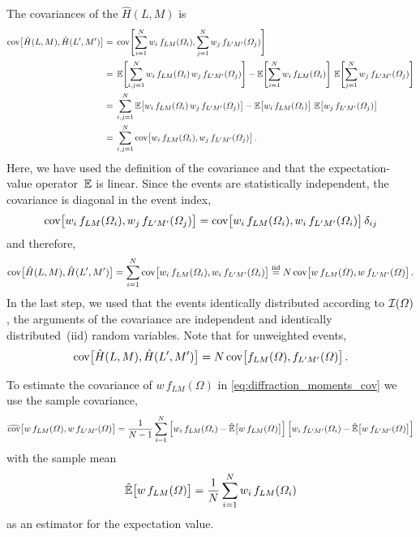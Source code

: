 The covariances of the $\hat{H}(L, M)$ is
\begin{align}
  \cov[1]{\hat{H}(L, M), \hat{H}(L', M')}
  ={}& \cov[4]{\sum_{i = 1}^N w_i\, f_{L M}(\Omega_i), \sum_{j = 1}^N w_j\, f_{L' M'}(\Omega_j)} \nonumber
  \\
  ={}& \exptVal[4]{\sum_{i, j = 1}^N w_i\,f_{L M}(\Omega_i)\,  w_j\, f_{L' M'}(\Omega_j)}
     - \exptVal[4]{\sum_{i = 1}^N w_i\, f_{L M}(\Omega_i)}\, \exptVal[4]{\sum_{j = 1}^N w_j\, f_{L' M'}(\Omega_j)} \nonumber
  \\
  ={}& \sum_{i, j = 1}^N \exptVal[1]{w_i\, f_{L M}(\Omega_i)\, w_j\, f_{L' M'}(\Omega_j)}
     - \exptVal[1]{w_i\, f_{L M}(\Omega_i)}\, \exptVal[1]{w_j\, f_{L' M'}(\Omega_j)} \nonumber
  \\
  ={}& \sum_{i, j = 1}^N \cov[1]{w_i\, f_{L M}(\Omega_i), w_j\, f_{L' M'}(\Omega_j)}.
\end{align}
Here, we have used the definition of the covariance and that the
expectation-value operator~$\operatorname{\mathbb{E}}$ is linear.  Since the events
are statistically independent, the covariance is diagonal in the event
index, \ie
\begin{equation}
  \label{eq:diffraction_cov_indep_events}
  \cov[1]{w_i\, f_{L M}(\Omega_i), w_j\, f_{L' M'}(\Omega_j)}
  = \cov[1]{w_i\, f_{L M}(\Omega_i), w_i\, f_{L' M'}(\Omega_i)} \delta_{i j}
\end{equation}
and therefore,
\begin{equation}
  \label{eq:diffraction_moments_cov}
  \cov[1]{\hat{H}(L, M), \hat{H}(L', M')}
  = \sum_{i = 1}^N \cov[1]{w_i\, f_{L M}(\Omega_i), w_i\, f_{L' M'}(\Omega_i)}
  \equalUsing{\text{iid}} N \cov[1]{w\, f_{L M}(\Omega), w\, f_{L' M'}(\Omega)}.
\end{equation}
In the last step, we used that the events identically distributed
according to $\mathcal{I}(\Omega)$, \ie the arguments of the covariance
are independent and identically distributed~(iid) random variables.
Note that for unweighted events,
\begin{equation}
  \label{eq:diffraction_moments_cov_unweighted}
  \cov[1]{\hat{H}(L, M), \hat{H}(L', M')}
  =  N \cov[1]{f_{L M}(\Omega), f_{L' M'}(\Omega)}.
\end{equation}

To estimate the covariance of $w\, f_{L M}(\Omega)$ in
\cref{eq:diffraction_moments_cov} we use the sample covariance, \ie
\begin{equation}
  \label{eq:diffraction_base_fcn_cov}
  \covEst[1]{w\, f_{L M}(\Omega), w\, f_{L' M'}(\Omega)}
  = \frac{1}{N - 1} \sum_{i = 1}^N
  \sBrk[2]{w_i\, f_{L M}(\Omega_i) - \exptValEst[1]{w\, f_{L M}(\Omega)}} \sBrk[2]{w_i\, f_{L' M'}(\Omega_i) - \exptValEst[1]{w\, f_{L' M'}(\Omega)}}
\end{equation}
with the sample mean
\begin{equation}
  \label{eq:diffraction_w_f_sample_mean}
  \exptValEst[1]{w\, f_{L M}(\Omega)}
  = \frac{1}{N} \sum_{i = 1}^N w_i\, f_{L M}(\Omega_i)
\end{equation}
as an estimator for the expectation value.

